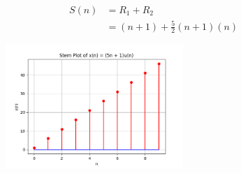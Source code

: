 \documentclass[journal,12pt,twocolumn]{IEEEtran}
\theoremstyle{remark}
\begin{document}
\begin{align}
 S(n) &= R_1 + R_2\\
    &= (n+1) + \frac{5}{2}(n+1)(n)
\end{align}
\begin{figure}[h]
  \centering
  \includegraphics[width=0.6\textwidth]{figs/stem.png}
 
  \label{fig:Stem_Plot}
\end{figure}
\end{document}
